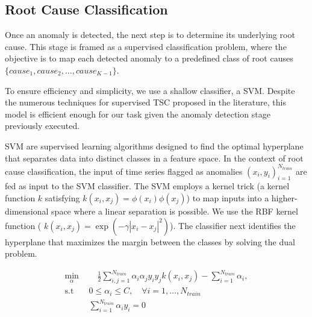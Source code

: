 
\subsection{Root Cause Classification}

Once an anomaly is detected, the next step is to determine its underlying root cause. This stage is framed as a supervised classification problem, where the objective is to map each detected anomaly to a predefined class of root causes $\{cause_1, cause_2, \ldots, cause_{K-1}\}$.

To ensure efficiency and simplicity, we use a shallow classifier, a \ac{SVM}. Despite the numerous techniques for supervised TSC proposed in the literature, this model is efficient enough for our task given the anomaly detection stage previously executed. 

SVM are supervised learning algorithms designed to find the optimal hyperplane that separates data into distinct classes in a feature space. In the context of root cause classification, the input of time series flagged as anomalies ${(x_i, y_i)}_{i=1}^{N_{train}}$ are fed as input to the SVM classifier. The SVM employs a kernel trick (a kernel function $k$ satisfying $k(x_i, x_j) = \phi(x_i) \phi(x_j)$) to map inputs into a higher-dimensional space where a linear separation is possible. We use the \ac{RBF} kernel function ( $k(x_i, x_j) = \exp(-\gamma |x_i - x_j|^2)$). The classifier next identifies the hyperplane that maximizes the margin between the classes by solving the dual problem.

\begin{equation}
\begin{split}
    \min_{\alpha} & \quad \frac{1}{2} \sum_{i, j=1}^{N_{train}} \alpha_i \alpha_j y_i y_j k(x_i, x_j) - \sum_{i=1}^{N_{train}}  \alpha_i, \\
    \text{s.t} \quad & 0 \leq \alpha_i \leq C, \quad \forall i = 1, \ldots, N_{train} \\
                & \sum_{i=1}^{N_{train}}  \alpha_i y_i = 0
\end{split}
\end{equation}


